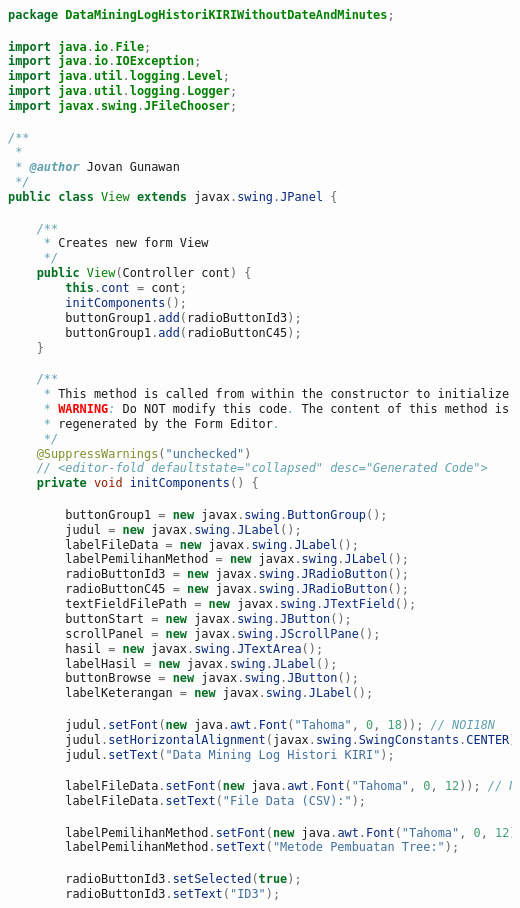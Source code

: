 \begin{lstlisting}[language=Java,basicstyle=\tiny,caption=View.java]
package DataMiningLogHistoriKIRIWithoutDateAndMinutes;

import java.io.File;
import java.io.IOException;
import java.util.logging.Level;
import java.util.logging.Logger;
import javax.swing.JFileChooser;

/**
 *
 * @author Jovan Gunawan
 */
public class View extends javax.swing.JPanel {

    /**
     * Creates new form View
     */
    public View(Controller cont) {
        this.cont = cont;
        initComponents();
        buttonGroup1.add(radioButtonId3);
        buttonGroup1.add(radioButtonC45);
    }

    /**
     * This method is called from within the constructor to initialize the form.
     * WARNING: Do NOT modify this code. The content of this method is always
     * regenerated by the Form Editor.
     */
    @SuppressWarnings("unchecked")
    // <editor-fold defaultstate="collapsed" desc="Generated Code">                          
    private void initComponents() {

        buttonGroup1 = new javax.swing.ButtonGroup();
        judul = new javax.swing.JLabel();
        labelFileData = new javax.swing.JLabel();
        labelPemilihanMethod = new javax.swing.JLabel();
        radioButtonId3 = new javax.swing.JRadioButton();
        radioButtonC45 = new javax.swing.JRadioButton();
        textFieldFilePath = new javax.swing.JTextField();
        buttonStart = new javax.swing.JButton();
        scrollPanel = new javax.swing.JScrollPane();
        hasil = new javax.swing.JTextArea();
        labelHasil = new javax.swing.JLabel();
        buttonBrowse = new javax.swing.JButton();
        labelKeterangan = new javax.swing.JLabel();

        judul.setFont(new java.awt.Font("Tahoma", 0, 18)); // NOI18N
        judul.setHorizontalAlignment(javax.swing.SwingConstants.CENTER);
        judul.setText("Data Mining Log Histori KIRI");

        labelFileData.setFont(new java.awt.Font("Tahoma", 0, 12)); // NOI18N
        labelFileData.setText("File Data (CSV):");

        labelPemilihanMethod.setFont(new java.awt.Font("Tahoma", 0, 12)); // NOI18N
        labelPemilihanMethod.setText("Metode Pembuatan Tree:");

        radioButtonId3.setSelected(true);
        radioButtonId3.setText("ID3");


\end{lstlisting}
